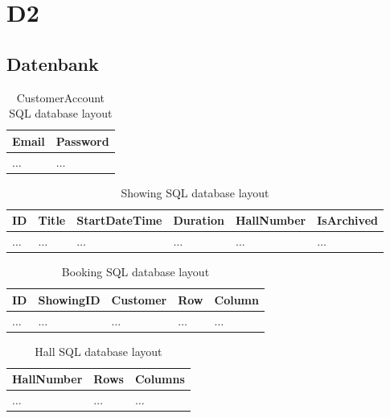 \documentclass[a4paper,10pt,titlepage,bibtotoc,bibtotocnumbered]{scrreprt}
\begin{document}
\section{D2}

\subsection{Datenbank}

\begin{table}[H]
    \centering
    \begin{tabular}{|l|l|}
        \hline
        \textbf{Email} & \textbf{Password}
        \\\hline\hline
        $\ldots$ & $\ldots$
        \\\hline
    \end{tabular}
    \caption{CustomerAccount SQL database layout}
    \label{tab:dblayout_CustomerAccount}
\end{table}

\begin{table}[H]
\centering
\begin{tabular}{|l|l|l|l|l|l|}
    \hline
    \textbf{ID} &
    \textbf{Title} &
    \textbf{StartDateTime} &
    \textbf{Duration} &
    \textbf{HallNumber} &
    \textbf{IsArchived}
    \\\hline\hline
    $\ldots$ & $\ldots$ & $\ldots$ & $\ldots$ & $\ldots$ & $\ldots$
    \\\hline
\end{tabular}
\caption{Showing SQL database layout}
\label{tab:dblayout_Showing}
\end{table}

\begin{table}[H]
\centering
\begin{tabular}{|l|l|l|l|l|}
    \hline
    \textbf{ID} &
    \textbf{ShowingID} &
    \textbf{Customer} &
    \textbf{Row} &
    \textbf{Column}
    \\\hline\hline
    $\ldots$ & $\ldots$ & $\ldots$ & $\ldots$ & $\ldots$
    \\\hline
\end{tabular}
\caption{Booking SQL database layout}
\label{tab:dblayout_Booking}
\end{table}

\begin{table}[H]
\centering
\begin{tabular}{|l|l|l|}
    \hline
    \textbf{HallNumber} &
    \textbf{Rows} &
    \textbf{Columns}
    \\\hline\hline
    $\ldots$ & $\ldots$ & $\ldots$
    \\\hline
\end{tabular}
\caption{Hall SQL database layout}
\label{tab:dblayout_Hall}
\end{table}
\end{document}
